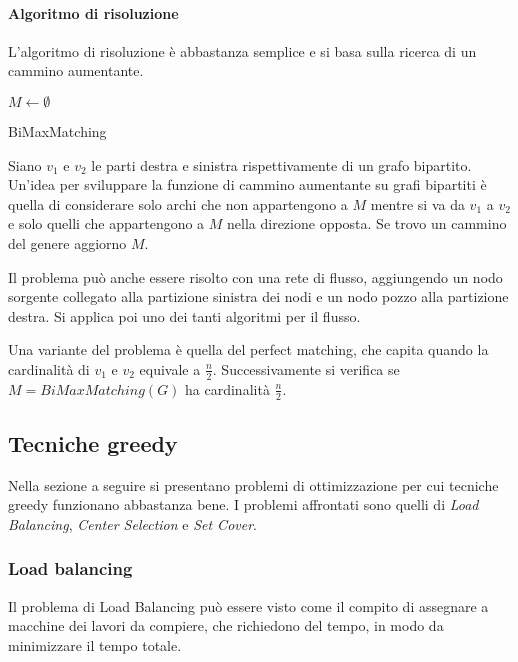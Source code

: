 \paragraph{Algoritmo di risoluzione}
L'algoritmo di risoluzione è abbastanza semplice e si basa sulla 
ricerca di un cammino aumentante.

\begin{algorithm}[H]
    \SetAlgoLined
     $M \gets \emptyset$\\
     \caption{BiMaxMatching}
\end{algorithm}
Siano $v_1$ e $v_2$ le parti destra e sinistra rispettivamente di un grafo bipartito.\\
Un'idea per sviluppare la funzione di cammino aumentante su grafi bipartiti è quella
di considerare solo archi che non appartengono a $M$ mentre si va da $v_1$ a $v_2$ e 
solo quelli che appartengono a $M$ nella direzione opposta.
Se trovo un cammino del genere aggiorno $M$.
\begin{remark}
    Il problema può anche essere risolto con una rete di flusso, aggiungendo un nodo
    sorgente collegato alla partizione sinistra dei nodi e un nodo pozzo alla partizione
    destra. Si applica poi uno dei tanti algoritmi per il flusso.
\end{remark}
\begin{remark}
    Una variante del problema è quella del perfect matching, che capita quando 
    la cardinalità di $v_1$ e $v_2$ equivale a $\frac{n}{2}$. Successivamente si 
    verifica se $M = \mathit{BiMaxMatching}(G)$ ha cardinalità $\frac{n}{2}$.
\end{remark}

\subsection{Tecniche greedy}
Nella sezione a seguire si presentano problemi di ottimizzazione per cui 
tecniche greedy funzionano abbastanza bene. 
I problemi affrontati sono quelli di \emph{Load Balancing}, \emph{Center Selection} e \emph{Set Cover}.

\subsubsection{Load balancing}
Il problema di Load Balancing può essere visto come il compito
di assegnare a macchine dei lavori da compiere, che richiedono del tempo, 
in modo da minimizzare il tempo totale.

